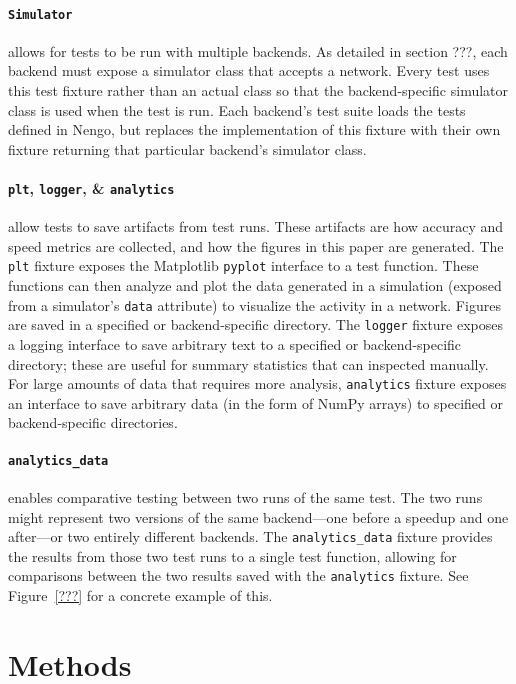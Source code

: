 \documentclass{frontiersSCNS}
\begin{document}
\paragraph{\texttt{Simulator}}
allows for tests to be run with multiple backends.
As detailed in section ???,
each backend must expose a simulator class
that accepts a network.
Every test uses this test fixture rather than
an actual class so that
the backend-specific simulator class is used
when the test is run.
Each backend's test suite loads
the tests defined in Nengo,
but replaces the implementation of
this fixture with their own fixture
returning that particular backend's simulator class.

\paragraph{\texttt{plt}, \texttt{logger}, \& \texttt{analytics}}
allow tests to save artifacts from test runs.
These artifacts are how accuracy and speed metrics
are collected, and how the figures
in this paper are generated.
The \texttt{plt} fixture exposes the Matplotlib \cite{???}
\texttt{pyplot} interface to a test function.
These functions can then analyze and plot
the data generated in a simulation
(exposed from a simulator's \texttt{data} attribute)
to visualize the activity in a network.
Figures are saved in a specified or backend-specific directory.
The \texttt{logger} fixture exposes a logging interface
to save arbitrary text to a specified
or backend-specific directory;
these are useful for summary statistics
that can inspected manually.
For large amounts of data that
requires more analysis,
\texttt{analytics} fixture exposes an interface
to save arbitrary data (in the form of NumPy arrays)
to specified or backend-specific directories.

\paragraph{\texttt{analytics\_data}}
enables comparative testing between
two runs of the same test.
The two runs might represent two versions
of the same backend---one before a
speedup and one after---or two
entirely different backends.
The \texttt{analytics\_data} fixture
provides the results from those two
test runs to a single test function,
allowing for comparisons
between the two results saved
with the \texttt{analytics} fixture.
See Figure~\ref{???} for a
concrete example of this.

\section{Methods}
\end{document}
